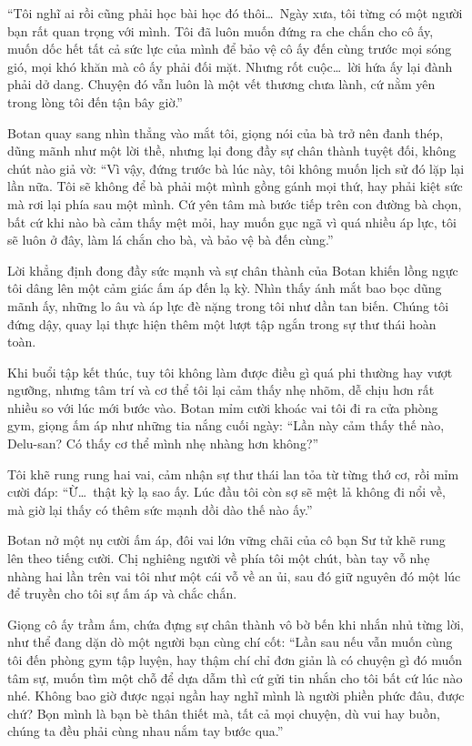 \documentclass[../main.tex]{subfiles}
\begin{document}
``Tôi nghĩ ai rồi cũng phải học bài học đó thôi\dots\ Ngày xưa, tôi từng có một người bạn rất quan trọng với mình. Tôi đã luôn muốn đứng ra che chắn cho cô ấy, muốn dốc hết tất cả sức lực của mình để bảo vệ cô ấy đến cùng trước mọi sóng gió, mọi khó khăn mà cô ấy phải đối mặt. Nhưng rốt cuộc\dots\ lời hứa ấy lại đành phải dở dang. Chuyện đó vẫn luôn là một vết thương chưa lành, cứ nằm yên trong lòng tôi đến tận bây giờ.''

Botan quay sang nhìn thẳng vào mắt tôi, giọng nói của bà trở nên đanh thép, dũng mãnh như một lời thề, nhưng lại đong đầy sự chân thành tuyệt đối, không chút nào giả vờ: ``Vì vậy, đứng trước bà lúc này, tôi không muốn lịch sử đó lặp lại lần nữa. Tôi sẽ không để bà phải một mình gồng gánh mọi thứ, hay phải kiệt sức mà rơi lại phía sau một mình. Cứ yên tâm mà bước tiếp trên con đường bà chọn, bất cứ khi nào bà cảm thấy mệt mỏi, hay muốn gục ngã vì quá nhiều áp lực, tôi sẽ luôn ở đây, làm lá chắn cho bà, và bảo vệ bà đến cùng.''

Lời khẳng định đong đầy sức mạnh và sự chân thành của Botan khiến lồng ngực tôi dâng lên một cảm giác ấm áp đến lạ kỳ. Nhìn thấy ánh mắt bao bọc dũng mãnh ấy, những lo âu và áp lực đè nặng trong tôi như dần tan biến. Chúng tôi đứng dậy, quay lại thực hiện thêm một lượt tập ngắn trong sự thư thái hoàn toàn.

\ct

Khi buổi tập kết thúc, tuy tôi không làm được điều gì quá phi thường hay vượt ngưỡng, nhưng tâm trí và cơ thể tôi lại cảm thấy nhẹ nhõm, dễ chịu hơn rất nhiều so với lúc mới bước vào. Botan mỉm cười khoác vai tôi đi ra cửa phòng gym, giọng ấm áp như những tia nắng cuối ngày: ``Lần này cảm thấy thế nào, Delu-san? Có thấy cơ thể mình nhẹ nhàng hơn không?''

Tôi khẽ rung rung hai vai, cảm nhận sự thư thái lan tỏa từ từng thớ cơ, rồi mỉm cười đáp: ``Ừ\dots\ thật kỳ lạ sao ấy. Lúc đầu tôi còn sợ sẽ mệt lả không đi nổi về, mà giờ lại thấy có thêm sức mạnh dồi dào thế nào ấy.''

Botan nở một nụ cười ấm áp, đôi vai lớn vững chãi của cô bạn Sư tử khẽ rung lên theo tiếng cười. Chị nghiêng người về phía tôi một chút, bàn tay vỗ nhẹ nhàng hai lần trên vai tôi như một cái vỗ về an ủi, sau đó giữ nguyên đó một lúc để truyền cho tôi sự ấm áp và chắc chắn.

Giọng cô ấy trầm ấm, chứa đựng sự chân thành vô bờ bến khi nhắn nhủ từng lời, như thể đang dặn dò một người bạn cùng chí cốt: ``Lần sau nếu vẫn muốn cùng tôi đến phòng gym tập luyện, hay thậm chí chỉ đơn giản là có chuyện gì đó muốn tâm sự, muốn tìm một chỗ để dựa dẫm thì cứ gửi tin nhắn cho tôi bất cứ lúc nào nhé. Không bao giờ được ngại ngần hay nghĩ mình là người phiền phức đâu, được chứ? Bọn mình là bạn bè thân thiết mà, tất cả mọi chuyện, dù vui hay buồn, chúng ta đều phải cùng nhau nắm tay bước qua.''
\end{document}
